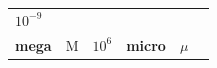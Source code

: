 {\begin{tabular}[t]{|l|l|l|l|l|l|}
    
        
                \begin{math}{10}^{-9}\end{math}
     \tabularnewline\cline{1-1}\cline{2-2}\cline{3-3}\cline{4-4}\cline{5-5}\cline{6-6}
    
    
        
                \textbf{mega}
               &
    
    
        M &
    
    
        
                \begin{math}{10}^{6}\end{math}
               &
    
    
        
                \textbf{micro}
               &
    
    
        
                \begin{math}\mu \end{math}
               &
    
    

\end{tabular}}
